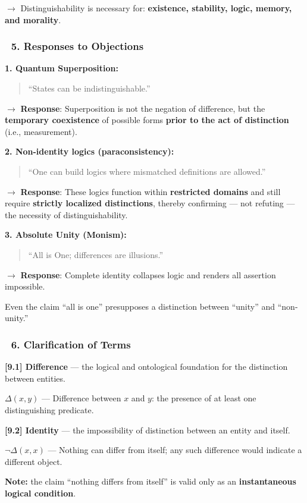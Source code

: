 \documentclass[12pt]{article}
\begin{document}
$\rightarrow$ Distinguishability is necessary for: \textbf{existence, stability, logic, memory, and morality}.

\subsubsection*{🔹 5. Responses to Objections}
\textbf{1. Quantum Superposition:}
\begin{quote}
``States can be indistinguishable.''
\end{quote}
$\rightarrow$ \textbf{Response}: Superposition is not the negation of difference, but the \textbf{temporary coexistence} of possible forms \textbf{prior to the act of distinction} (i.e., measurement).

\bigskip
\textbf{2. Non-identity logics (paraconsistency):}
\begin{quote}
``One can build logics where mismatched definitions are allowed.''
\end{quote}
$\rightarrow$ \textbf{Response}: These logics function within \textbf{restricted domains} and still require \textbf{strictly localized distinctions}, thereby confirming — not refuting — the necessity of distinguishability.

\bigskip
\textbf{3. Absolute Unity (Monism):}
\begin{quote}
``All is One; differences are illusions.''
\end{quote}
$\rightarrow$ \textbf{Response}: Complete identity collapses logic and renders all assertion impossible.

Even the claim ``all is one'' presupposes a distinction between ``unity'' and ``non-unity.''

\subsubsection*{🔹 6. Clarification of Terms}
\textbf{[9.1] Difference} — the logical and ontological foundation for the distinction between entities.

\quad $\Delta(x, y)$ — Difference between $x$ and $y$: the presence of at least one distinguishing predicate.

\bigskip
\textbf{[9.2] Identity} — the impossibility of distinction between an entity and itself.

\quad $\neg \Delta(x, x)$ — Nothing can differ from itself; any such difference would indicate a different object.

\bigskip
\textbf{Note:} the claim ``nothing differs from itself'' is valid only as an \textbf{instantaneous logical condition}.
\end{document}
